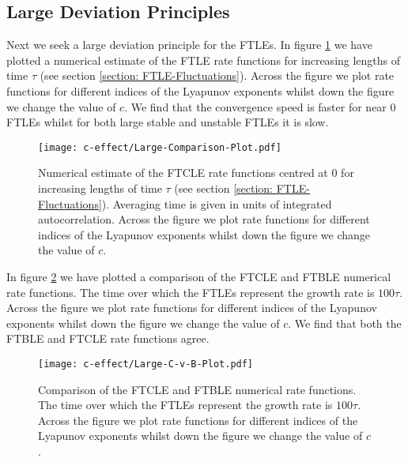 \subsection{Large Deviation Principles}

Next we seek a large deviation principle for the FTLEs. In figure \ref{fig: Rate-Convergence} we have plotted a numerical estimate of the FTLE rate functions for increasing lengths of time $\tau$ (see section \ref{section: FTLE-Fluctuations}). Across the figure we plot rate functions for different indices of the Lyapunov exponents whilst down the figure we change the value of $c$. We find that the convergence speed is faster for near $0$ FTLEs whilst for both large stable and unstable FTLEs it is slow.\\

\begin{figure}
    \centering
    \texttt{[image: c-effect/Large-Comparison-Plot.pdf]}
    \caption{Numerical estimate of the FTCLE rate functions centred at $0$ for increasing lengths of time $\tau$ (see section \ref{section: FTLE-Fluctuations}). Averaging time is given in units of integrated autocorrelation. Across the figure we plot rate functions for different indices of the Lyapunov exponents whilst down the figure we change the value of $c$.}
    \label{fig: Rate-Convergence}
\end{figure}

In figure \ref{fig: Rate-C-v-B} we have plotted a comparison of the FTCLE and FTBLE numerical rate functions. The time over which the FTLEs represent the growth rate is $100 \tau$. Across the figure we plot rate functions for different indices of the Lyapunov exponents whilst down the figure we change the value of $c$. We find that both the FTBLE and FTCLE rate functions agree.\\

\begin{figure}
    \centering
    \texttt{[image: c-effect/Large-C-v-B-Plot.pdf]}
    \caption{Comparison of the FTCLE and FTBLE numerical rate functions. The time over which the FTLEs represent the growth rate is $100 \tau$. Across the figure we plot rate functions for different indices of the Lyapunov exponents whilst down the figure we change the value of $c$.}
    \label{fig: Rate-C-v-B}
\end{figure}

%
